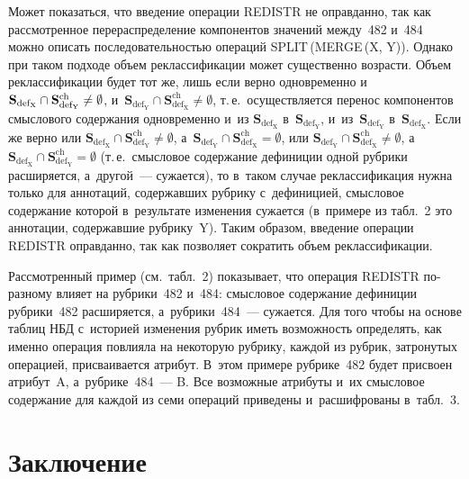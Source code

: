 \begin{multicols}{2}
Может показаться, что введение операции \mbox{REDISTR} не оправданно, так как 
рассмотренное перераспределение компонентов значений между~482 и~484 
можно описать последовательностью операций SPLIT\,(MERGE\,(X, Y)). 
Однако при таком подходе объем реклассификации может существенно 
возрасти. Объем реклассификации будет тот же, лишь если верно 
одновременно и~$\mathbf{S}_{\mathrm{def_X}}\hm\cap 
\mathbf{S}_{\mathrm{def_Y}}^{\mathrm{ch}}\hm\not= \emptyset$, 
и~$\mathbf{S}_{\mathrm{def_Y}} \cap 
\mathbf{S}_{\mathrm{def_X}}^{\mathrm{ch}}\not= \emptyset$, т.\,е.\ 
осуществляется перенос компонентов смыслового содержания одновременно 
и~из $\mathbf{S}_{\mathrm{def_X}}$ в~$\mathbf{S}_{\mathrm{def_Y}}$, 
и~из~$\mathbf{S}_{\mathrm{def_Y}}$ в~$\mathbf{S}_{\mathrm{def_X}}$. Если 
же верно или $\mathbf{S}_{\mathrm{def_X}} \cap 
\mathbf{S}_{\mathrm{def_Y}}^{\mathrm{ch}}\not= \emptyset$, 
а~$\mathbf{S}_{\mathrm{def_Y}} \cap 
\mathbf{S}_{\mathrm{def_X}}^{\mathrm{ch}} = \emptyset$, или 
$\mathbf{S}_{\mathrm{def_Y}} \cap 
\mathbf{S}_{\mathrm{def_X}}^{\mathrm{ch}}\not= \emptyset$, 
а~$\mathbf{S}_{\mathrm{def_X}} \cap 
\mathbf{S}_{\mathrm{def_Y}}^{\mathrm{ch}}=\emptyset$ (т.\,е.\ смысловое 
содержание дефиниции одной рубрики расширяется, а~другой~--- сужается), 
то в~таком случае реклассификация нужна только для аннотаций, 
содержавших рубрику с~дефиницией, смысловое
содержание которой 
в~результате изменения сужается (в~примере из табл.~2 это аннотации, 
содержавшие руб\-ри\-ку~Y). Таким образом, введение операции \mbox{REDISTR} 
оправданно, так как позволяет сократить объем реклассификации.

Рассмотренный пример (см.\ табл.~2) показывает, что операция REDISTR  
по-раз\-но\-му влияет на руб\-ри\-ки~482 и~484: смысловое содержание 
дефиниции руб\-ри\-ки~482 расширяется, а~руб\-ри\-ки~484~--- сужается. 
Для того чтобы на основе таб\-лиц НБД с~историей изменения руб\-рик иметь 
возможность определять, как именно операция повлияла на некоторую 
руб\-ри\-ку, каждой из руб\-рик, затронутых операцией, присваивается атрибут. 
В~этом примере руб\-ри\-ке~482 будет присвоен атрибут~A,  
а~руб\-ри\-ке~484~--- B. Все возможные атрибуты и~их смыс\-ло\-вое 
содержание для каждой из семи операций приведены и~расшифрованы 
в~табл.~3.

\vspace*{-3pt}

\section{Заключение}


\end{multicols}
